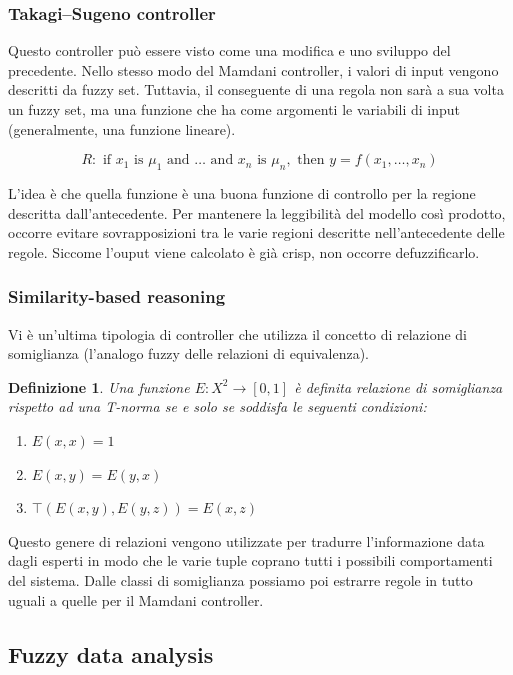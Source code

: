 \documentclass[10pt,a4paper]{article}
\newtheorem{definition}{Definizione}
\begin{document}
\subsubsection{Takagi–Sugeno controller}

Questo controller può essere visto come una modifica e uno sviluppo del precedente. Nello stesso modo del Mamdani controller, i valori di input vengono descritti da fuzzy set. Tuttavia, il conseguente di una regola non sarà a sua volta un fuzzy set, ma una funzione che ha come argomenti le variabili di input (generalmente, una funzione lineare).

$$
R : \text{ if } x_1 \text{ is } \mu_1 \text{ and } \dots \text{ and } x_n \text{ is } \mu_n, \text{ then } y = f(x_1,\dots,x_n)
$$

 L'idea è che quella funzione è una buona funzione di controllo per la regione descritta dall'antecedente. Per mantenere la leggibilità del modello così prodotto, occorre evitare sovrapposizioni tra le varie regioni descritte nell'antecedente delle regole. Siccome l'ouput viene calcolato è già crisp, non occorre defuzzificarlo.
 
\subsubsection{Similarity-based reasoning}

Vi è un'ultima tipologia di controller che utilizza il concetto di relazione di somiglianza (l'analogo fuzzy delle relazioni di equivalenza).

\begin{definition}
Una funzione $E: X^2 \to [0,1]$ è definita \emph{relazione di somiglianza} rispetto ad una T-norma se e solo se soddisfa le seguenti condizioni:
\begin{enumerate}
\item{$E(x,x) = 1$}
\item{$E(x,y) = E(y,x)$}
\item{$\top (E(x,y),E(y,z)) = E(x,z)$}
\end{enumerate} 
\end{definition}

Questo genere di relazioni vengono utilizzate per tradurre l'informazione data dagli esperti in modo che le varie tuple coprano tutti i possibili comportamenti del sistema. Dalle classi di somiglianza possiamo poi estrarre regole in tutto uguali a quelle per il Mamdani controller.

\subsection{Fuzzy data analysis}
\end{document}
